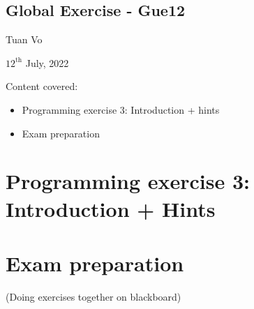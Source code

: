 \documentclass[12pt]{article}
\begin{document}
\begin{center}
	\section*{Global Exercise - Gue12}
\end{center}
\begin{center}
	Tuan Vo
\end{center}
\begin{center}
	$12^{\text{th}}$ July, 2022
\end{center}
Content covered:
\begin{itemize}
	\item[\checkmark] Programming exercise 3: Introduction + hints
	\item[\checkmark] Exam preparation
\end{itemize}

\section{Programming exercise 3: Introduction + Hints}
\newpage
{}

\newpage
\section{Exam preparation}
(Doing exercises together on blackboard)

\end{document}
